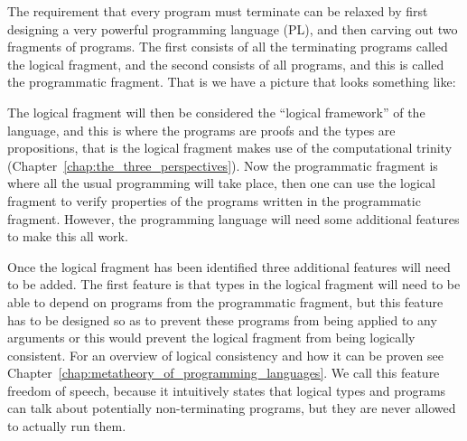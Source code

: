 

\renewcommand{\FSdrulename}[1]{\textsc{\scriptsize #1}}

\newcommand{\tvdash}[1]{\vdash^{#1}}
\newcommand{\arrowT}[5]{(#1 :^{#2} #3)^{#4} \to #5}
\newcommand{\rec}[3]{rec\ #1\ #2\ #3}
\newcommand{\recc}[3]{rec^{-}\ #1\ #3}

The requirement that every program must terminate can be relaxed by
first designing a very powerful programming language (PL), and then
carving out two fragments of programs. The first consists of all the
terminating programs called the logical fragment, and the second
consists of all programs, and this is called the programmatic
fragment. That is we have a picture that looks something like:
\begin{center}
\end{center}
The logical fragment will then be considered the ``logical framework''
of the language, and this is where the programs are proofs and the
types are propositions, that is the logical fragment makes use of the
computational trinity (Chapter~\ref{chap:the_three_perspectives}).
Now the programmatic fragment is where all the usual programming will
take place, then one can use the logical fragment to verify properties
of the programs written in the programmatic fragment.  However, the
programming language will need some additional features to make this
all work.

Once the logical fragment has been identified three additional
features will need to be added.  The first feature is that types in
the logical fragment will need to be able to depend on programs from
the programmatic fragment, but this feature has to be designed so as
to prevent these programs from being applied to any arguments or this
would prevent the logical fragment from being logically consistent.
For an overview of logical consistency and how it can be proven see
Chapter~\ref{chap:metatheory_of_programming_languages}.  We call this
feature freedom of speech, because it intuitively states that logical
types and programs can talk about potentially non-terminating
programs, but they are never allowed to actually run them.


